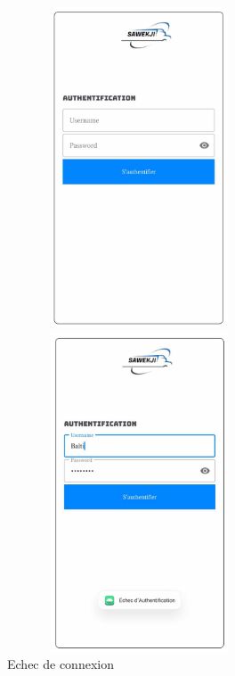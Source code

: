 \begin{figure}[htbp]
  \centering
  \begin{minipage}{0.45\textwidth}
    \centering
    \includegraphics[width=0.7\textwidth,height=9.5cm]{chap3.images/authentfication mob.png}
    \caption{}

  \end{minipage}
  \hfill
  \begin{minipage}{0.45\textwidth}
    \centering
    \includegraphics[width=0.7\textwidth,height=9.5cm]{chap3.images/echec authentification mob.png}
    \caption{Echec de connexion }

  \end{minipage}
\end{figure}



